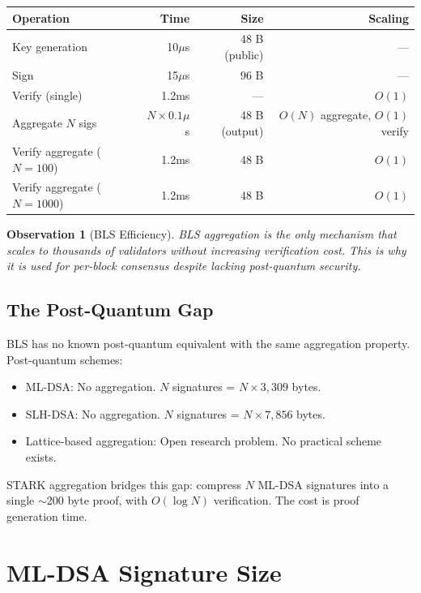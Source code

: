 \documentclass[11pt,a4paper]{article}
\newtheorem{observation}{Observation}[section]
\begin{document}
\begin{center}
\begin{tabular}{lrrr}
\toprule
\textbf{Operation} & \textbf{Time} & \textbf{Size} & \textbf{Scaling} \\
\midrule
Key generation & 10$\mu$s & 48 B (public) & --- \\
Sign & 15$\mu$s & 96 B & --- \\
Verify (single) & 1.2ms & --- & $O(1)$ \\
Aggregate $N$ sigs & $N \times 0.1\mu$s & 48 B (output) & $O(N)$ aggregate, $O(1)$ verify \\
Verify aggregate ($N=100$) & 1.2ms & 48 B & $O(1)$ \\
Verify aggregate ($N=1000$) & 1.2ms & 48 B & $O(1)$ \\
\bottomrule
\end{tabular}
\end{center}

\begin{observation}[BLS Efficiency]
BLS aggregation is the only mechanism that scales to thousands of validators without increasing verification cost. This is why it is used for per-block consensus despite lacking post-quantum security.
\end{observation}

\subsection{The Post-Quantum Gap}

BLS has no known post-quantum equivalent with the same aggregation property. Post-quantum schemes:
\begin{itemize}[leftmargin=2em]
\item ML-DSA: No aggregation. $N$ signatures = $N \times 3{,}309$ bytes.
\item SLH-DSA: No aggregation. $N$ signatures = $N \times 7{,}856$ bytes.
\item Lattice-based aggregation: Open research problem. No practical scheme exists.
\end{itemize}

STARK aggregation bridges this gap: compress $N$ ML-DSA signatures into a single $\sim$200 byte proof, with $O(\log N)$ verification. The cost is proof generation time.

\section{ML-DSA Signature Size}
\end{document}
